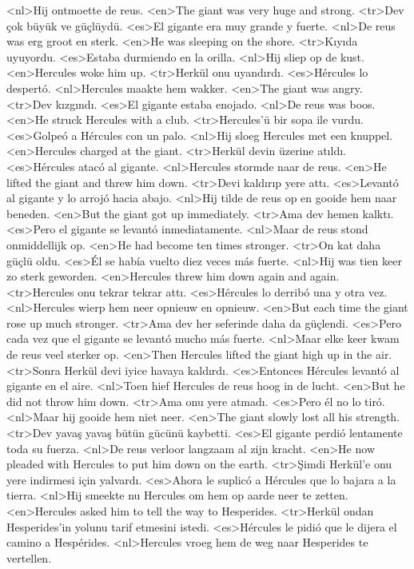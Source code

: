 <nl>Hij ontmoette de reus.
<en>The giant was very huge and strong.
<tr>Dev çok büyük ve güçlüydü.
<es>El gigante era muy grande y fuerte.
<nl>De reus was erg groot en sterk.
<en>He was sleeping on the shore.
<tr>Kıyıda uyuyordu.
<es>Estaba durmiendo en la orilla.
<nl>Hij sliep op de kust.
<en>Hercules woke him up.
<tr>Herkül onu uyandırdı.
<es>Hércules lo despertó.
<nl>Hercules maakte hem wakker.
<en>The giant was angry.
<tr>Dev kızgındı.
<es>El gigante estaba enojado.
<nl>De reus was boos.
<en>He struck Hercules with a club.
<tr>Hercules'ü bir sopa ile vurdu.
<es>Golpeó a Hércules con un palo.
<nl>Hij sloeg Hercules met een knuppel.
<en>Hercules charged at the giant.
<tr>Herkül devin üzerine atıldı.
<es>Hércules atacó al gigante.
<nl>Hercules stormde naar de reus.
<en>He lifted the giant and threw him down.
<tr>Devi kaldırıp yere attı.
<es>Levantó al gigante y lo arrojó hacia abajo.
<nl>Hij tilde de reus op en gooide hem naar beneden.
<en>But the giant got up immediately.
<tr>Ama dev hemen kalktı.
<es>Pero el gigante se levantó inmediatamente.
<nl>Maar de reus stond onmiddellijk op.
<en>He had become ten times stronger.
<tr>On kat daha güçlü oldu.
<es>Él se había vuelto diez veces más fuerte.
<nl>Hij was tien keer zo sterk geworden.
<en>Hercules threw him down again and again.
<tr>Hercules onu tekrar tekrar attı.
<es>Hércules lo derribó una y otra vez.
<nl>Hercules wierp hem neer opnieuw en opnieuw.
<en>But each time the giant rose up much stronger.
<tr>Ama dev her seferinde daha da güçlendi.
<es>Pero cada vez que el gigante se levantó mucho más fuerte.
<nl>Maar elke keer kwam de reus veel sterker op.
<en>Then Hercules lifted the giant high up in the air.
<tr>Sonra Herkül devi iyice havaya kaldırdı.
<es>Entonces Hércules levantó al gigante en el aire.
<nl>Toen hief Hercules de reus hoog in de lucht.
<en>But he did not throw him down.
<tr>Ama onu yere atmadı.
<es>Pero él no lo tiró.
<nl>Maar hij gooide hem niet neer.
<en>The giant slowly lost all his strength.
<tr>Dev yavaş yavaş bütün gücünü kaybetti.
<es>El gigante perdió lentamente toda su fuerza.
<nl>De reus verloor langzaam al zijn kracht.
<en>He now pleaded with Hercules to put him down on the earth.
<tr>Şimdi Herkül'e onu yere indirmesi için yalvardı.
<es>Ahora le suplicó a Hércules que lo bajara a la tierra.
<nl>Hij smeekte nu Hercules om hem op aarde neer te zetten.
<en>Hercules asked him to tell the way to Hesperides.
<tr>Herkül ondan Hesperides'in yolunu tarif etmesini istedi.
<es>Hércules le pidió que le dijera el camino a Hespérides.
<nl>Hercules vroeg hem de weg naar Hesperides te vertellen.
